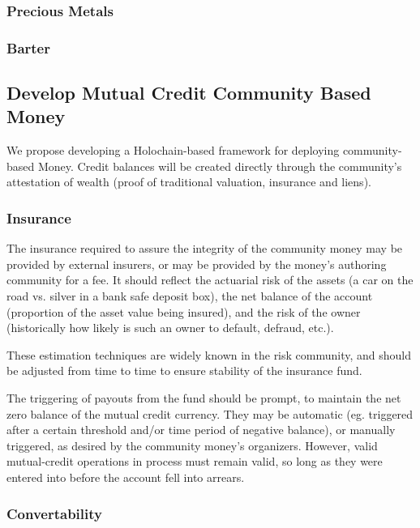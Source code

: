 \documentclass[11pt]{article}
\begin{document}
\subsubsection{Precious Metals}
\label{sec:orge732543}

\subsubsection{Barter}
\label{sec:orgff70e87}

\subsection{Develop Mutual Credit Community Based Money}
\label{sec:org2005095}

We propose developing a Holochain-based framework for deploying community-based Money.  Credit balances will  be created
directly through the community's attestation of wealth (proof of traditional valuation, insurance and liens).

\subsubsection{Insurance}
\label{sec:org15716bb}

The insurance required to assure the integrity of the community money may be provided by external
insurers, or may be provided by the money's authoring community for a fee.  It should reflect the
actuarial risk of the assets (a car on the road vs. silver in a bank safe deposit box), the net
balance of the account (proportion of the asset value being insured), and the risk of the owner
(historically how likely is such an owner to default, defraud, etc.).

These estimation techniques are widely known in the risk community, and should be adjusted from
time to time to ensure stability of the insurance fund.

The triggering of payouts from the fund should be prompt, to maintain the net zero balance of the
mutual credit currency.  They may be automatic (eg. triggered after a certain threshold and/or
time period of negative balance), or manually triggered, as desired by the community money's
organizers.  However, valid mutual-credit operations in process must remain valid, so long as
they were entered into before the account fell into arrears.

\subsubsection{Convertability}
\label{sec:orgbe17227}
\end{document}
